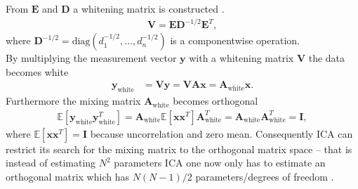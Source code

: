 From $\mathbf{E}$ and $\mathbf{D}$ a whitening matrix is constructed \cite[p.159]{ICA}.
\begin{align*}
\mathbf{V} = \mathbf{ED}^{-1/2} \mathbf{E}^T,
\end{align*}
where $\mathbf{D}^{-1/2} = \text{diag}(d_1^{-1/2},\dots, d_n^{-1/2})$ is a componentwise operation.
\\  
By multiplying the measurement vector $\mathbf{y}$ with a whitening matrix $\mathbf{V}$ the data becomes white
\begin{align}
\mathbf{y}_{\text{white}} &= \mathbf{Vy} = \mathbf{VAx} = \mathbf{A}_{\text{white}} \mathbf{x}. \nonumber
\end{align}
Furthermore the mixing matrix $\mathbf{A}_{\text{white}}$ becomes orthogonal 
\begin{align*}
 \mathbb{E}[\mathbf{y}_{\text{white}} \mathbf{y}_{\text{white}}^T] = \mathbf{A}_{\text{white}} \mathbb{E}[\mathbf{xx}^T] \mathbf{A}_{\text{white}}^T = \mathbf{A}_{\text{white}} \mathbf{A}_{\text{white}}^T = \mathbf{I},
 \end{align*} 
where $\mathbb{E}[\mathbf{xx}^T] = \mathbf{I}$ because uncorrelation and zero mean. Consequently ICA can restrict its search for the mixing matrix to the orthogonal matrix space -- that is instead of estimating $N^2$ parameters ICA one now only has to estimate an orthogonal matrix which has $N(N-1)/2$ parameters/degrees of freedom \cite[p. 159]{ICA}
.

